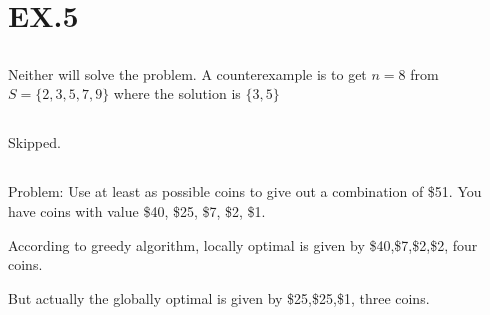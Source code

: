 \documentclass[12pt,a4paper]{article}
\theoremstyle{definition}
\begin{document}
    
\section{EX.5}
\subsection{}
    \par Neither will solve the problem. A counterexample is to get $n=8$ from $S=\{2,3,5,7,9\}$ where the solution is  $\{3,5\}$
\subsection{}
    \par Skipped.
\subsection{}
    \par Problem: Use at least as possible coins to give out a combination of \$51. You have coins with value \$40, \$25, \$7, \$2, \$1.
    \par According to greedy algorithm, locally optimal is given by \$40,\$7,\$2,\$2, four coins.
    \par But actually the globally optimal is given by \$25,\$25,\$1, three coins.
\end{document}
